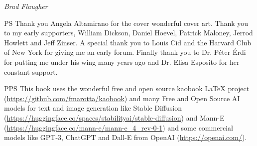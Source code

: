 \begin{flushright}
	\textit{Brad Flaugher}
\end{flushright}

PS Thank you Angela Altamirano for the cover wonderful cover art. Thank you to my early supporters, William Dickson, Daniel Hoevel, Patrick Maloney, Jerrod Howlett and Jeff Zinser. A special thank you to Louis Cid and the Harvard Club of New York for giving me an early forum. Finally thank you to Dr. Péter Érdi for putting me under his wing many years ago and Dr. Elisa Esposito for her constant support. 

PPS This book uses the wonderful free and open source kaobook LaTeX project (\url{https://github.com/fmarotta/kaobook}) and  many Free and Open Source AI  models for text and image generation like Stable Diffusion (\url{https://huggingface.co/spaces/stabilityai/stable-diffusion}) and Mann-E (\url{https://huggingface.co/mann-e/mann-e_4_rev-0-1}) and some commercial models like GPT-3, ChatGPT and Dall-E from OpenAI (\url{https://openai.com/}).
